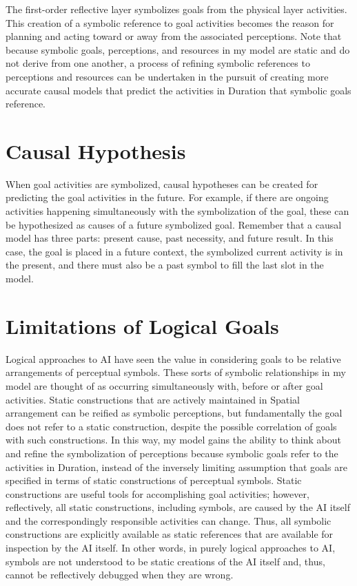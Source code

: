 The first-order reflective layer symbolizes goals from the physical
layer activities.  This creation of a symbolic reference to goal
activities becomes the reason for planning and acting toward or away
from the associated perceptions.  Note that because symbolic goals,
perceptions, and resources in my model are static and do not derive
from one another, a process of refining symbolic references to
perceptions and resources can be undertaken in the pursuit of creating
more accurate causal models that predict the activities in Duration
that symbolic goals reference.

\section{Causal Hypothesis}

When goal activities are symbolized, causal hypotheses can be created
for predicting the goal activities in the future.  For example, if
there are ongoing activities happening simultaneously with the
symbolization of the goal, these can be hypothesized as causes of a
future symbolized goal.  Remember that a causal model has three parts:
present cause, past necessity, and future result.  In this case, the
goal is placed in a future context, the symbolized current activity is
in the present, and there must also be a past symbol to fill the last
slot in the model.

\section{Limitations of Logical Goals}

Logical approaches to AI have seen the value in considering goals to
be relative arrangements of perceptual symbols.  These sorts of
symbolic relationships in my model are thought of as occurring
simultaneously with, before or after goal activities.  Static
constructions that are actively maintained in Spatial arrangement can
be reified as symbolic perceptions, but fundamentally the goal does
not refer to a static construction, despite the possible correlation
of goals with such constructions.  In this way, my model gains the
ability to think about and refine the symbolization of perceptions
because symbolic goals refer to the activities in Duration, instead of
the inversely limiting assumption that goals are specified in terms of
static constructions of perceptual symbols.  Static constructions are
useful tools for accomplishing goal activities; however, reflectively,
all static constructions, including symbols, are caused by the AI
itself and the correspondingly responsible activities can change.
Thus, all symbolic constructions are explicitly available as static
references that are available for inspection by the AI itself.  In
other words, in purely logical approaches to AI, symbols are not
understood to be static creations of the AI itself and, thus, cannot
be reflectively debugged when they are wrong.

